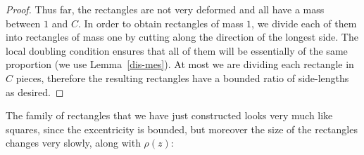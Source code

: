 \documentclass[12pt,twoside,final,psamsfonts]{amsart}
\theoremstyle{plain}
\theoremstyle{remark}
\theoremstyle{definition}
\begin{document}
\begin{proof}
%

Thus far, the rectangles are not very deformed and all have a mass between
$1$ and $C$. In order to obtain rectangles of mass $1$, we 
divide each of them into
rectangles of mass one by cutting along the direction of the longest side. 
The local
doubling condition ensures that all of them
will be essentially of the same proportion (we use Lemma~\ref{dis-mes}).
At most we are dividing
each rectangle in $C$ pieces, therefore the resulting rectangles have 
a bounded ratio of
side-lengths as desired.
\end{proof}
The family of rectangles that we have just constructed looks very much like
squares, since the excentricity is bounded, but moreover the size of the
rectangles changes very slowly, along with $\rho(z)$:
\end{document}
